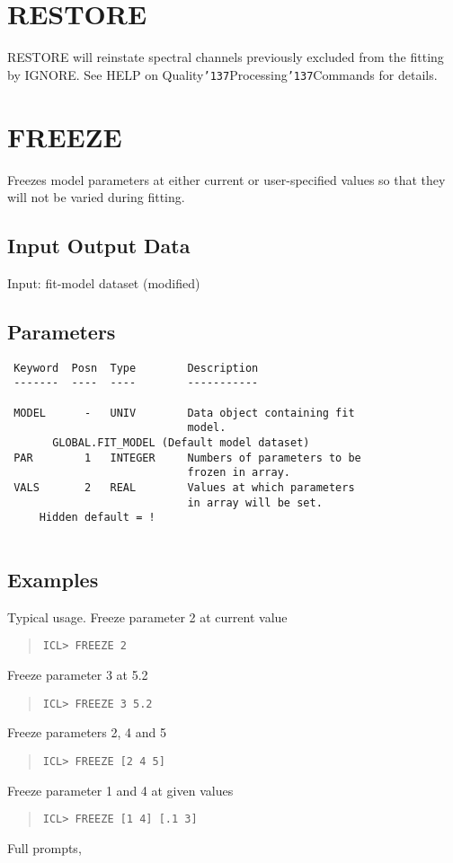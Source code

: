 \documentclass{book}
\renewcommand{\_}{{\tt\char'137}}     %
\begin{document}
\section{RESTORE}
RESTORE will reinstate spectral channels previously excluded from
the fitting by IGNORE.
See HELP on Quality\_Processing\_Commands for details.
\section{FREEZE}
Freezes model parameters at either current or user-specified
values so that they will not be varied during fitting.
\subsection{Input Output Data}
Input: fit-model dataset (modified)
\subsection{Parameters}
\begin{verbatim}
 Keyword  Posn  Type        Description
 -------  ----  ----        -----------
 
 MODEL      -   UNIV        Data object containing fit
                            model.
       GLOBAL.FIT_MODEL (Default model dataset)
 PAR        1   INTEGER     Numbers of parameters to be
                            frozen in array.
 VALS       2   REAL        Values at which parameters
                            in array will be set.
     Hidden default = !
 
\end{verbatim}\subsection{Examples}
Typical usage. Freeze parameter 2 at current value
\begin{quote}\begin{verbatim}
ICL> FREEZE 2
\end{verbatim}\end{quote}
Freeze parameter 3 at 5.2
\begin{quote}\begin{verbatim}
ICL> FREEZE 3 5.2
\end{verbatim}\end{quote}
Freeze parameters 2, 4 and 5
\begin{quote}\begin{verbatim}
ICL> FREEZE [2 4 5]
\end{verbatim}\end{quote}
Freeze parameter 1 and 4 at given values
\begin{quote}\begin{verbatim}
ICL> FREEZE [1 4] [.1 3]
\end{verbatim}\end{quote}
Full prompts,
 
\end{document}
